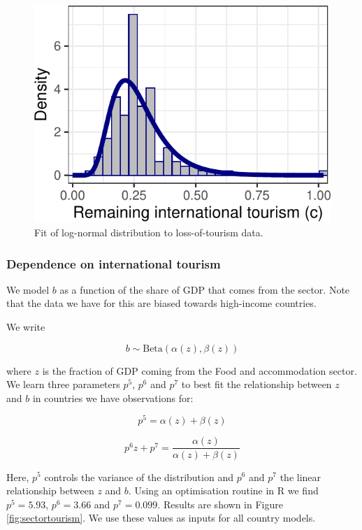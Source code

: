 \documentclass[
]{article}
\begin{document}
\begin{figure}

{\centering \includegraphics{README_files/figure-latex/ytd-1} 

}

\caption{Fit of log-normal distribution to loss-of-tourism data.}\label{fig:ytd}
\end{figure}

\newpage

\hypertarget{dependence-on-international-tourism}{%
\subsubsection{Dependence on international tourism}\label{dependence-on-international-tourism}}

We model \(b\) as a function of the share of GDP that comes from the sector. Note that the data we have for this are biased towards high-income countries.

We write

\[b\sim\text{Beta}(\alpha(z),\beta(z))\]

where \(z\) is the fraction of GDP coming from the Food and accommodation sector. We learn three parameters \(p^5\), \(p^6\) and \(p^7\) to best fit the relationship between \(z\) and \(b\) in countries we have observations for:

\[p^5 = \alpha(z)+\beta(z)\]

\[p^6 z + p^7 = \frac{\alpha(z)}{\alpha(z)+\beta(z)}\]

Here, \(p^5\) controls the variance of the distribution and \(p^6\) and \(p^7\) the linear relationship between \(z\) and \(b\). Using an optimisation routine in R we find \(p^5=5.93\), \(p^6=3.66\) and \(p^7=0.099\). Results are shown in Figure \ref{fig:sectortourism}. We use these values as inputs for all country models.
\end{document}

